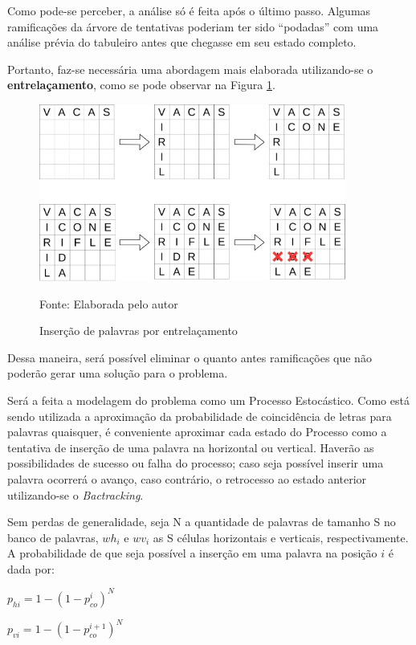 Como pode-se perceber, a análise só é feita após o último passo. Algumas ramificações da árvore de tentativas poderiam ter sido ``podadas'' com uma análise prévia do tabuleiro antes que chegasse em seu estado completo.   

Portanto, faz-se necessária uma abordagem mais elaborada utilizando-se o \textbf{entrelaçamento}, como se pode observar na Figura \ref{fig:entrelacamento}. 

\begin{figure}[H] 
\centering
    \caption{Inserção de palavras por entrelaçamento}
    \label{fig:entrelacamento}
    \includegraphics[width=0.9\textwidth]{Figuras/entrelacamento.jpg}
    
    Fonte: Elaborada pelo autor
\end{figure}

Dessa maneira, será possível eliminar o quanto antes ramificações que não poderão gerar uma solução para o problema.

Será a feita a modelagem do problema como um Processo Estocástico. Como está sendo utilizada a aproximação da probabilidade de coincidência de letras para palavras quaisquer,
é conveniente aproximar cada estado do Processo como a tentativa de inserção de uma palavra na horizontal ou vertical. Haverão as possibilidades de sucesso ou falha do processo; caso seja possível inserir uma palavra ocorrerá o avanço, caso contrário, o retrocesso ao estado anterior utilizando-se o \textit{Bactracking}. 

Sem perdas de generalidade, seja N a quantidade de palavras de tamanho S no banco de palavras, $wh_{i}$ e $wv_{i}$ as S células horizontais e verticais, respectivamente. A probabilidade de que seja possível a inserção em uma palavra na posição $i$ é dada por:

\begin{center}
    \Large{$p_{hi} = 1 - (1 - p_{co}^{i})^{N}$}
    
    \Large{$p_{vi} = 1 - (1 - p_{co}^{i+1})^{N}$}
\end{center}

